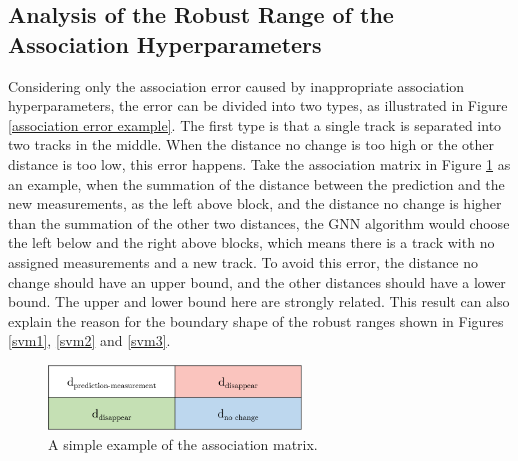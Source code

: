\subsection{Analysis of the Robust Range of the Association Hyperparameters}


Considering only the association error caused by inappropriate association hyperparameters, the error can be divided into two types, as illustrated in Figure \ref{association error example}. The first type is that a single track is separated into two tracks in the middle. When the distance no change is too high or the other distance is too low, this error happens. Take the association matrix in Figure \ref{asso example simple} as an example, when the summation of the distance between the prediction and the new measurements, as the left above block, and the distance no change is higher than the summation of the other two distances, the GNN algorithm would choose the left below and the right above blocks, which means there is a track with no assigned measurements and a new track. To avoid this error, the distance no change should have an upper bound, and the other distances should have a lower bound. The upper and lower bound here are strongly related. This result can also explain the reason for the boundary shape of the robust ranges shown in Figures \ref{svm1}, \ref{svm2} and \ref{svm3}.

\begin{figure}[htbp]
\centering
\includegraphics[width=0.6\textwidth]{figures/Asso/association matrix example simple.png}
\caption{A simple example of the association matrix.}
\label{asso example simple}
\end{figure}

